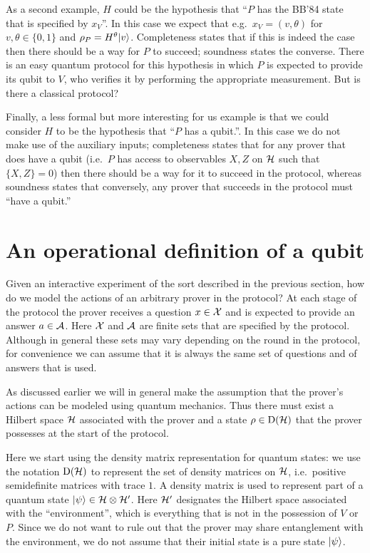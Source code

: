As a second example, $H$ could be the hypothesis that ``$P$ has the BB'84 state that is specified by $x_V$''. In this case we expect that e.g.\ $x_V = (v,\theta)$ for $v,\theta\in \{0,1\}$ and $\rho_P = H^\theta |v\rangle$. Completeness states that if this is indeed the case then there should be a way for $P$ to succeed; soundness states the converse. There is an easy quantum protocol for this hypothesis in which $P$ is expected to provide its qubit to $V$, who verifies it by performing the appropriate measurement. But is there a classical protocol?  

Finally, a less formal but more interesting for us example is that we could consider $H$ to be the hypothesis that ``$P$ has a qubit.''. In this case we do not make use of the auxiliary inputs; completeness states that for any prover that does have a qubit (i.e.\ $P$ has access to observables $X,Z$ on $\mathcal{H}$ such that $\{X,Z\}=0$) then there should be a way for it to succeed in the protocol, whereas soundness states that conversely, any prover that succeeds in the protocol must ``have a qubit.''

\section{An operational definition of a qubit} 
\label{sec:operational-qubit}

Given an interactive experiment of the sort described in the previous section, how do we model the actions of an arbitrary prover in the protocol? At each stage of the protocol the prover receives a question $x\in \mathcal{X}$ and is expected to provide an answer $a\in\mathcal{A}$. Here $\mathcal{X}$ and $\mathcal{A}$ are finite sets that are specified by the protocol. Although in general these sets may vary depending on the round in the protocol, for convenience we can assume that it is always the same set of questions and of answers that is used. 

As discussed earlier we will in general make the assumption that the prover's actions can be modeled using quantum mechanics. Thus there must exist a Hilbert space $\mathcal{H}$  associated with the prover and a state $\rho \in \mathrm{D}(\mathcal{H})$ that the prover possesses at the start of the protocol. 

\begin{remark} Here we start using the density matrix representation for quantum states: we use the notation $\mathrm{D}(\mathcal{H})$ to represent the set of density matrices on $\mathcal{H}$, i.e.\ positive semidefinite matrices with trace $1$. A density matrix is used to represent part of a quantum state $|\psi\rangle \in \mathcal{H} \otimes \mathcal{H}'$. Here $\mathcal{H}'$ designates the Hilbert space associated with the ``environment'', which is everything that is not in the possession of $V$ or $P$. Since we do not want to rule out that the prover may share entanglement with the environment, we do not assume that their initial state is a pure state $|\psi\rangle$.  
\end{remark}

